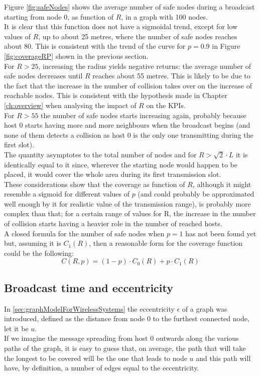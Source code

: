 \hfill \break
Figure \ref{fig:safeNodes} shows the average number of safe nodes during a broadcast starting from node 0, as function of $R$, in a graph with 100 nodes.\\
It is clear that this function does not have a sigmoidal trend, except for low values of $R$, up to about 25 metres, where the number of safe nodes reaches about 80. This is consistent with the trend of the curve for $p=0.9$ in Figure \ref{fig:coverageRP} shown in the previous section.\\
For $R > 25$, increasing the radius yields negative returns: the average number of safe nodes decreases until $R$ reaches about 55 metres. This is likely to be due to the fact that the increase in the number of collision takes over on the increase of reachable nodes. This is consistent with the hypothesis made in Chapter \ref{ch:overview} when analysing the impact of $R$ on the KPIs.\\
For $R > 55$ the number of safe nodes starts increasing again, probably because host 0 starts having more and more neighbours when the broadcast begins (and none of them detects a collision as host 0 is the only one transmitting during the first slot).\\ The quantity asymptotes to the total number of nodes and for $R > \sqrt{2}{\cdot}L$ it is identically equal to it since, wherever the starting node would happen to be placed, it would cover the whole area during its first transmission slot.\\
\hfill \break
These considerations show that the coverage as function of $R$, although it might resemble a sigmoid for different values of $p$ (and could probably be approximated well enough by it for realistic value of the transmission range), is probably more complex than that; for a certain range of values for R, the increase in the number of collision starts having a heavier role in the number of reached hosts.\\
A closed formula for the number of safe nodes when $p=1$ has not been found yet but, assuming it is $C_{1}(R)$, then a reasonable form for the coverage function could be the following:
\begin{equation}\label{eq:coverageClosedForm}
C(R, p) = (1-p)\cdot C_{0}(R) + p\cdot C_{1}(R)
\end{equation}
\newpage
\subsection{Broadcast time and eccentricity}\label{ssec:durationVsEccentricity}
In \ref{sec:graphModelForWirelessSystems} the eccentricity $\epsilon$ of a graph was introduced, defined as the distance from node 0 to the furthest connected node, let it be $u$.\\
If we imagine the message spreading from host 0 outwards along the various paths of the graph, it is easy to guess that, on average, the path that will take the longest to be covered will be the one that leads to node $u$ and this path will have, by definition, a number of edges equal to the eccentricity.\\

